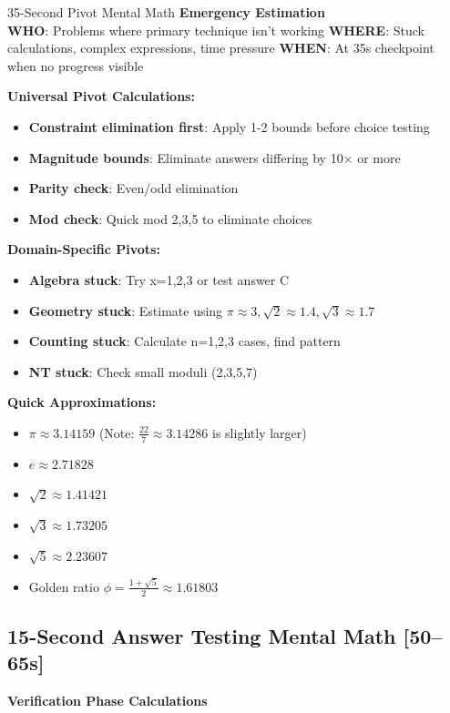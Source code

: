 \documentclass{article}
\begin{document}
\begin{mentalbox}{35-Second Pivot Mental Math}
{\footnotesize\textcolor{timegreen}{}}\quad\textbf{Emergency Estimation}\\
\textbf{WHO}: Problems where primary technique isn't working
\textbf{WHERE}: Stuck calculations, complex expressions, time pressure
\textbf{WHEN}: At 35s checkpoint when no progress visible

\textbf{Universal Pivot Calculations:}
\begin{itemize}[nosep]
\item \textbf{Constraint elimination first}: Apply 1-2 bounds before choice testing
\item \textbf{Magnitude bounds}: Eliminate answers differing by 10× or more
\item \textbf{Parity check}: Even/odd elimination
\item \textbf{Mod check}: Quick mod 2,3,5 to eliminate choices
\end{itemize}

\textbf{Domain-Specific Pivots:}
\begin{itemize}[nosep]
\item \textbf{Algebra stuck}: Try x=1,2,3 or test answer C
\item \textbf{Geometry stuck}: Estimate using $\pi \approx 3, \sqrt{2} \approx 1.4, \sqrt{3} \approx 1.7$
\item \textbf{Counting stuck}: Calculate n=1,2,3 cases, find pattern
\item \textbf{NT stuck}: Check small moduli (2,3,5,7)
\end{itemize}

\textbf{Quick Approximations:}
\begin{itemize}[nosep]
\item $\pi \approx 3.14159$ (Note: $\frac{22}{7} \approx 3.14286$ is slightly larger)
\item $e \approx 2.71828$
\item $\sqrt{2} \approx 1.41421$
\item $\sqrt{3} \approx 1.73205$
\item $\sqrt{5} \approx 2.23607$
\item Golden ratio $\phi = \frac{1+\sqrt{5}}{2} \approx 1.61803$
\end{itemize}
\end{mentalbox}

\subsection{15-Second Answer Testing Mental Math [50--65s]}
{\footnotesize\textcolor{timegreen}{}}\quad\textbf{Verification Phase Calculations}
\end{document}
